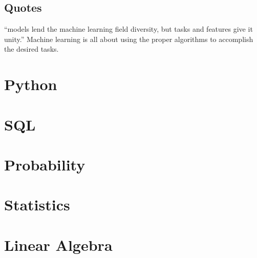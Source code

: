 \documentclass[11pt,letterpaper,oneside]{memoir}
\theoremstyle{definition}
\newtheorem{defn}{Definition}
\begin{document}
\section{Quotes}

``models lend the machine learning field diversity, but tasks and features give it unity.'' \cite[p. 13]{Flach2012}
Machine learning is all about using the proper algorithms to accomplish the desired \glspl{task}.
\begin{comment}
\begin{defn}[Task]
  \label{defn:task}
  An abstract representation of a problem we want to solve regarding the domain objects of import.
\end{defn}
\end{comment}

\chapter{Python}
\chapter{SQL}
\chapter{Probability}
\chapter{Statistics}
\chapter{Linear Algebra}
\printnoidxglossaries


\end{document}
